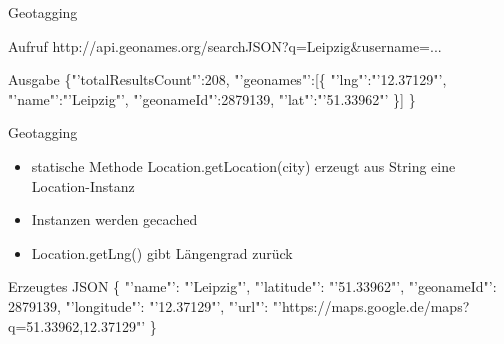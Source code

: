 \documentclass[12pt]{beamer}
\begin{document}
\begin{large}
\begin{frame}{Geotagging}
 \vspace*{\fill}
 \begin{block}{Aufruf}
 \normalsize http://api.geonames.org/searchJSON?q=Leipzig\&username=...
 \end{block}
 
 \begin{block}{Ausgabe}
 \normalsize \{"'totalResultsCount"':208,
  \newline
  \hspace*{0.5cm}"'geonames"':[\{
  \newline
  \hspace*{1cm}"'lng"':"'12.37129"',
  \newline
  \hspace*{1cm}"'name"':"'Leipzig"',
  \newline  
  \hspace*{1cm}"'geonameId"':2879139,
  \newline
  \hspace*{1cm}"'lat"':"'51.33962"'
  \newline
  \hspace*{0.5cm}\}]
  \newline
  \}
 \end{block}
\end{frame} 
 
\begin{frame}{Geotagging}
 \begin{itemize}
  \item statische Methode Location.getLocation(city) erzeugt aus String eine Location-Instanz
  \item Instanzen werden gecached
  \item Location.getLng() gibt Längengrad zurück
 \end{itemize}
 
 \vspace*{\fill}
 \begin{block}{Erzeugtes JSON}
 \normalsize \{
 \newline
 \hspace*{0.5cm}"'name"': "'Leipzig"',
 \newline
 \hspace*{0.5cm}"'latitude"': "'51.33962"',
 \newline
 \hspace*{0.5cm}"'geonameId"': 2879139,
 \newline
 \hspace*{0.5cm}"'longitude"': "'12.37129"',
 \newline
 \hspace*{0.5cm}"'url"': "'https://maps.google.de/maps?q=51.33962,12.37129"'
 \newline
 \}
 \end{block}
\end{frame}
 

\end{large}
\end{document}
